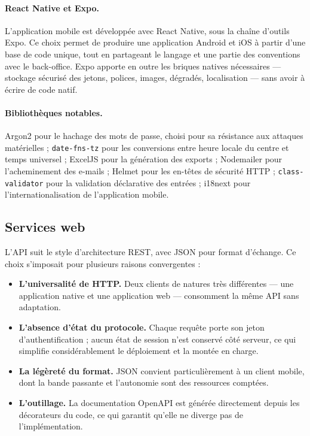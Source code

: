 \paragraph{React Native et Expo.} L'application mobile est développée avec
React Native, sous la chaîne d'outils Expo. Ce choix permet de produire une
application Android et iOS à partir d'une base de code unique, tout en
partageant le langage et une partie des conventions avec le back-office. Expo
apporte en outre les briques natives nécessaires --- stockage sécurisé des
jetons, polices, images, dégradés, localisation --- sans avoir à écrire de code
natif.

\paragraph{Bibliothèques notables.} Argon2 pour le hachage des mots de passe,
choisi pour sa résistance aux attaques matérielles ; \texttt{date-fns-tz} pour
les conversions entre heure locale du centre et temps universel ; ExcelJS pour
la génération des exports ; Nodemailer pour l'acheminement des e-mails ; Helmet
pour les en-têtes de sécurité HTTP ; \texttt{class-validator} pour la
validation déclarative des entrées ; i18next pour l'internationalisation de
l'application mobile.

\subsection{Services web}

L'API suit le style d'architecture REST, avec JSON pour format d'échange. Ce
choix s'imposait pour plusieurs raisons convergentes :

\begin{itemize}[leftmargin=1.2cm]
  \item \textbf{L'universalité de HTTP.} Deux clients de natures très
  différentes --- une application native et une application web --- consomment
  la même API sans adaptation.

  \item \textbf{L'absence d'état du protocole.} Chaque requête porte son jeton
  d'authentification ; aucun état de session n'est conservé côté serveur, ce
  qui simplifie considérablement le déploiement et la montée en charge.

  \item \textbf{La légèreté du format.} JSON convient particulièrement à un
  client mobile, dont la bande passante et l'autonomie sont des ressources
  comptées.

  \item \textbf{L'outillage.} La documentation OpenAPI est générée directement
  depuis les décorateurs du code, ce qui garantit qu'elle ne diverge pas de
  l'implémentation.
\end{itemize}

